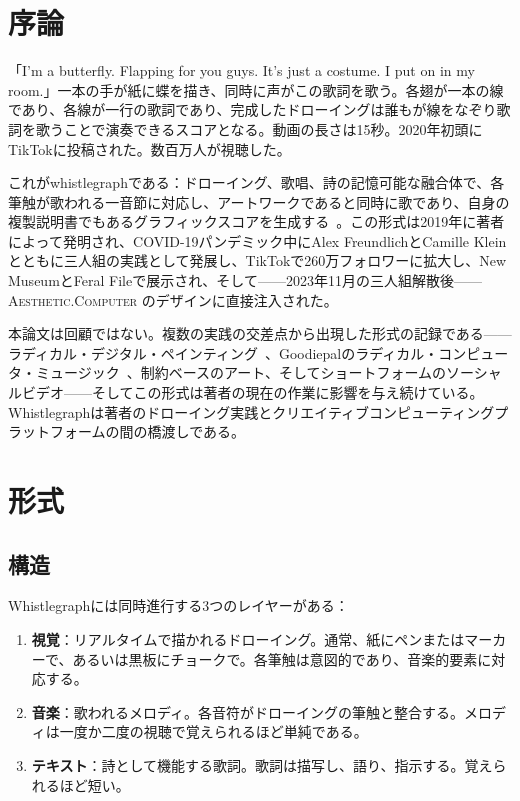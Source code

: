 \documentclass[10pt,letterpaper,twocolumn]{article}
\newcommand{\ac}{\textsc{Aesthetic.Computer}}
\begin{document}
\section{序論}

「I'm a butterfly. Flapping for you guys. It's just a costume. I put on in my room.」一本の手が紙に蝶を描き、同時に声がこの歌詞を歌う。各翅が一本の線であり、各線が一行の歌詞であり、完成したドローイングは誰もが線をなぞり歌詞を歌うことで演奏できるスコアとなる。動画の長さは15秒。2020年初頭にTikTokに投稿された。数百万人が視聴した。

これがwhistlegraphである：ドローイング、歌唱、詩の記憶可能な融合体で、各筆触が歌われる一音節に対応し、アートワークであると同時に歌であり、自身の複製説明書でもあるグラフィックスコアを生成する~\citep{dirt2023whistlegraph}。この形式は2019年に著者によって発明され、COVID-19パンデミック中にAlex FreundlichとCamille Kleinとともに三人組の実践として発展し、TikTokで260万フォロワーに拡大し、New MuseumとFeral Fileで展示され、そして——2023年11月の三人組解散後——\ac{} のデザインに直接注入された。

本論文は回顧ではない。複数の実践の交差点から出現した形式の記録である——ラディカル・デジタル・ペインティング~\citep{scudder2017manifesto}、Goodiepalのラディカル・コンピュータ・ミュージック~\citep{goodiepal2012elcamino}、制約ベースのアート、そしてショートフォームのソーシャルビデオ——そしてこの形式は著者の現在の作業に影響を与え続けている。Whistlegraphは著者のドローイング実践とクリエイティブコンピューティングプラットフォームの間の橋渡しである。

\section{形式}

\subsection{構造}

Whistlegraphには同時進行する3つのレイヤーがある：

\begin{enumerate}
  \item \textbf{視覚}：リアルタイムで描かれるドローイング。通常、紙にペンまたはマーカーで、あるいは黒板にチョークで。各筆触は意図的であり、音楽的要素に対応する。
  \item \textbf{音楽}：歌われるメロディ。各音符がドローイングの筆触と整合する。メロディは一度か二度の視聴で覚えられるほど単純である。
  \item \textbf{テキスト}：詩として機能する歌詞。歌詞は描写し、語り、指示する。覚えられるほど短い。
\end{enumerate}
\end{document}
